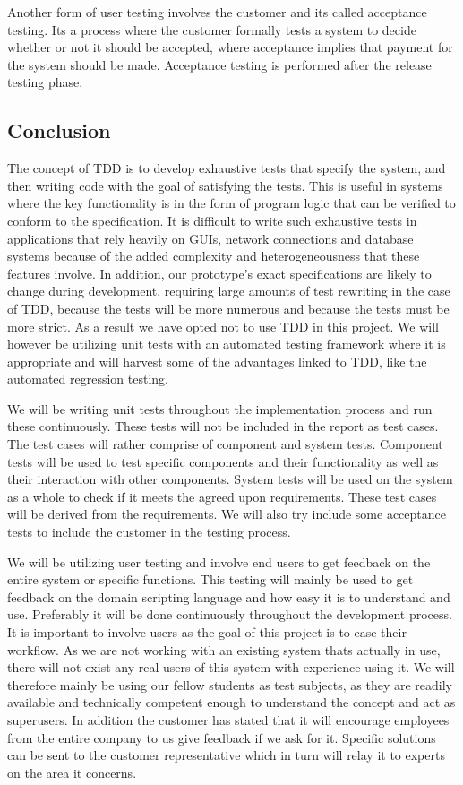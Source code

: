 Another form of user testing involves the customer and its called acceptance testing. Its a process where the customer formally tests a system to decide whether or not it should be accepted, where acceptance implies that payment for the system should be made. Acceptance testing is performed after the release testing phase.

\subsection{Conclusion}
The concept of TDD is to develop exhaustive tests that specify the system, and then writing code with the goal of satisfying the tests. This is useful in systems where the key functionality is in the form of program logic that can be verified to conform to the specification. It is difficult to write such exhaustive tests in applications that rely heavily on GUIs, network connections and database systems because of the added complexity and heterogeneousness that these features involve. In addition, our prototype's exact specifications are likely to change during development, requiring large amounts of test rewriting in the case of TDD, because the tests will be more numerous and because the tests must be more strict. As a result we have opted not to use TDD in this project. We will however be utilizing unit tests with an automated testing framework where it is appropriate and will harvest some of the advantages linked to TDD, like the automated regression testing.

We will be writing unit tests throughout the implementation process and run these continuously. These tests will not be included in the report as test cases. The test cases will rather comprise of component and system tests. Component tests will be used to test specific components and their functionality as well as their interaction with other components. System tests will be used on the system as a whole to check if it meets the agreed upon requirements. These test cases will be derived from the requirements. We will also try include some acceptance tests to include the customer in the testing process. 

We will be utilizing user testing and involve end users to get feedback on the entire system or specific functions. This testing will mainly be used to get feedback on the domain scripting language and how easy it is to understand and use. Preferably it will be done continuously throughout the development process. It is important to involve users as the goal of this project is to ease their workflow. As we are not working with an existing system thats actually in use, there will not exist any real users of this system with experience using it. We will therefore mainly be using our fellow students as test subjects, as they are readily available and technically competent enough to understand the concept and act as superusers. In addition the customer has stated that it will encourage employees from the entire company to us give feedback if we ask for it. Specific solutions can be sent to the customer representative which in turn will relay it to experts on the area it concerns.


